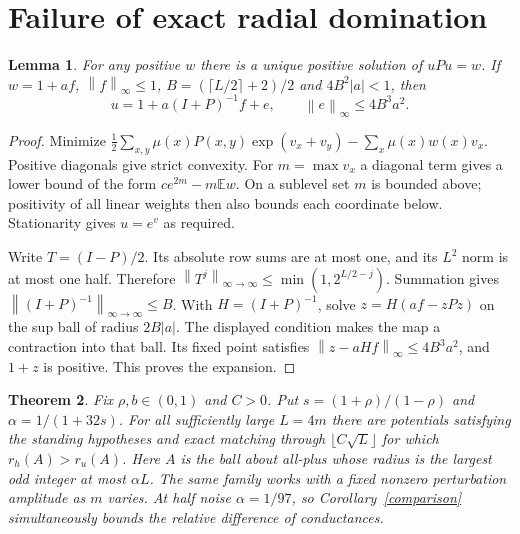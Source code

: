 \documentclass[11pt]{article}
\newtheorem{theorem}{Theorem}[section]
\newtheorem{lemma}[theorem]{Lemma}
\newcommand{\E}{\mathbb E}
\newcommand{\norm}[1]{\left\lVert#1\right\rVert}
\begin{document}
\section{Failure of exact radial domination}
\begin{lemma}\label{inverse}
For any positive $w$ there is a unique positive solution of $uPu=w$. If $w=1+af$, $\norm f_\infty\le1$, $B=(\lceil L/2\rceil+2)/2$ and $4B^2|a|<1$, then
\[
 u=1+a(I+P)^{-1}f+e,\qquad \norm e_\infty\le4B^3a^2 .
\]
\end{lemma}
\begin{proof}
Minimize $\frac12\sum_{x,y}\mu(x)P(x,y)\exp(v_x+v_y)-\sum_x\mu(x)w(x)v_x$. Positive diagonals give strict convexity. For $m=\max v_x$ a diagonal term gives a lower bound of the form $c e^{2m}-m\E w$. On a sublevel set $m$ is bounded above; positivity of all linear weights then also bounds each coordinate below. Stationarity gives $u=e^v$ as required.

Write $T=(I-P)/2$. Its absolute row sums are at most one, and its $L^2$ norm is at most one half. Therefore $\norm{T^j}_{\infty\to\infty}\le\min(1,2^{L/2-j})$. Summation gives $\norm{(I+P)^{-1}}_{\infty\to\infty}\le B$. With $H=(I+P)^{-1}$, solve $z=H(af-zPz)$ on the sup ball of radius $2B|a|$. The displayed condition makes the map a contraction into that ball. Its fixed point satisfies $\norm{z-aHf}_\infty\le4B^3a^2$, and $1+z$ is positive. This proves the expansion.
\end{proof}

\begin{theorem}\label{counter}
Fix $\rho,b\in(0,1)$ and $C>0$. Put $s=(1+\rho)/(1-\rho)$ and $\alpha=1/(1+32s)$. For all sufficiently large $L=4m$ there are potentials satisfying the standing hypotheses and exact matching through $\lfloor C\sqrt L\rfloor$ for which $r_h(A)>r_u(A)$. Here $A$ is the ball about all-plus whose radius is the largest odd integer at most $\alpha L$. The same family works with a fixed nonzero perturbation amplitude as $m$ varies. At half noise $\alpha=1/97$, so Corollary~\ref{comparison} simultaneously bounds the relative difference of conductances.
\end{theorem}
\end{document}
